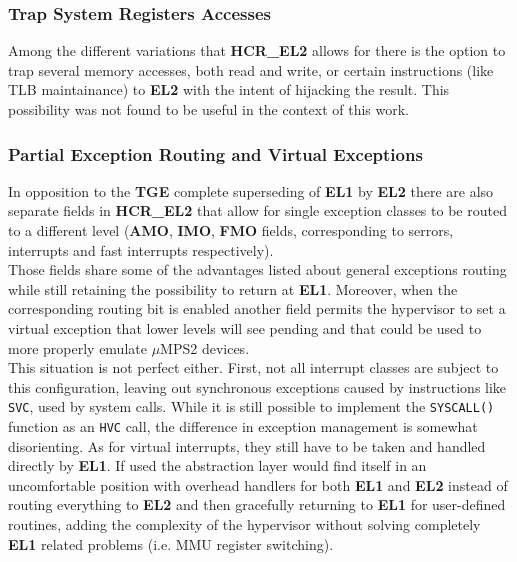 \documentclass[12pt,a4paper,openright,twoside]{report}
\begin{document}
\subsubsection{Trap System Registers Accesses}
Among the different variations that \textbf{HCR\_EL2} allows for there is the 
option to trap several memory accesses, both read and write, or certain instructions
(like TLB maintainance) to \textbf{EL2} with the intent of hijacking the result.
This possibility was not found to be useful in the context of this work.

\subsubsection{Partial Exception Routing and Virtual Exceptions}
In opposition to the \textbf{TGE} complete superseding of \textbf{EL1} by
\textbf{EL2} there are also separate fields in \textbf{HCR\_EL2} that allow
for single exception classes to be routed to a different level (\textbf{AMO}, 
\textbf{IMO}, \textbf{FMO} fields, corresponding to serrors, interrupts and
fast interrupts respectively).\\
Those fields share some of the advantages listed about general exceptions routing
while still retaining the possibility to return at \textbf{EL1}.
Moreover, when the corresponding routing bit is enabled another field permits the
hypervisor to set a virtual exception that lower levels will see pending and that
could be used to more properly emulate $\mu$MPS2 devices.\\

This situation is not perfect either. First, not all interrupt classes are subject
to this configuration, leaving out synchronous exceptions caused by instructions
like {\tt SVC}, used by system calls. While it is still possible to implement
the {\tt SYSCALL()} function as an {\tt HVC} call, the difference in exception
management is somewhat disorienting.
As for virtual interrupts, they still have to be taken and handled directly by 
\textbf{EL1}. If used the abstraction layer would find itself in an 
uncomfortable position with overhead handlers for both \textbf{EL1} and \textbf{EL2}
instead of routing everything to \textbf{EL2} and then gracefully returning to 
\textbf{EL1} for user-defined routines, adding the complexity of the hypervisor
without solving completely \textbf{EL1} related problems (i.e. MMU register 
switching).


\clearpage{\pagestyle{empty}\cleardoublepage}
\end{document}
